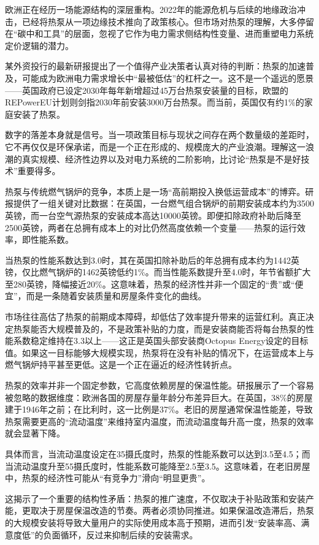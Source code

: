 \documentclass[11pt]{ctexart}
\begin{document}
欧洲正在经历一场能源结构的深层重构。2022年的能源危机与后续的地缘政治冲击，已经将热泵从一项边缘技术推向了政策核心。但市场对热泵的理解，大多停留在“碳中和工具”的层面，忽视了它作为电力需求侧结构性变量、进而重塑电力系统定价逻辑的潜力。

某外资投行的最新研报提出了一个值得产业决策者认真对待的判断：热泵的加速普及，可能成为欧洲电力需求增长中“最被低估”的杠杆之一。这不是一个遥远的愿景——英国政府已设定2030年每年新增超过45万台热泵安装量的目标，欧盟的REPowerEU计划则剑指2030年前安装3000万台热泵。而当前，英国仅有约1\%的家庭安装了热泵。

数字的落差本身就是信号。当一项政策目标与现状之间存在两个数量级的差距时，它不再仅仅是环保承诺，而是一个正在形成的、规模庞大的产业浪潮。理解这一浪潮的真实规模、经济性边界以及对电力系统的二阶影响，比讨论“热泵是不是好技术”重要得多。

热泵与传统燃气锅炉的竞争，本质上是一场“高前期投入换低运营成本”的博弈。研报提供了一组关键对比数据：在英国，一台燃气组合锅炉的前期安装成本约为3500英镑，而一台空气源热泵的安装成本高达10000英镑。即便扣除政府补助后降至2500英镑，两者在总拥有成本上的对比仍然高度依赖一个变量——热泵的运行效率，即性能系数。

当热泵的性能系数达到3.0时，其在英国扣除补助后的年总拥有成本约为1442英镑，仅比燃气锅炉的1462英镑低约1\%。而当性能系数提升至4.0时，年节省额扩大至280英镑，降幅接近20\%。这意味着，热泵的经济性并非一个固定的“贵”或“便宜”，而是一条随着安装质量和房屋条件变化的曲线。

市场往往高估了热泵的前期成本障碍，却低估了效率提升带来的运营红利。真正决定热泵能否大规模普及的，不是政策补贴的力度，而是安装商能否将每台热泵的性能系数稳定维持在3.3以上——这正是英国头部安装商Octopus Energy设定的目标值。如果这一目标能够大规模实现，热泵将在没有补贴的情况下，在运营成本上与燃气锅炉持平甚至更低。这是一个正在逼近的经济性转折点。

热泵的效率并非一个固定参数，它高度依赖房屋的保温性能。研报展示了一个容易被忽略的数据维度：欧洲各国的房屋存量年龄分布差异巨大。在英国，38\%的房屋建于1946年之前；在比利时，这一比例是37\%。老旧的房屋通常保温性能差，导致热泵需要更高的“流动温度”来维持室内温度，而流动温度每升高一度，热泵的效率就会显著下降。

具体而言，当流动温度设定在35摄氏度时，热泵的性能系数可以达到3.5至4.5；而当流动温度升至55摄氏度时，性能系数可能降至2.5至3.5。这意味着，在老旧房屋中，热泵的经济性可能从“有竞争力”滑向“明显更贵”。

这揭示了一个重要的结构性矛盾：热泵的推广速度，不仅取决于补贴政策和安装产能，更取决于房屋保温改造的节奏。两者必须协同推进。如果保温改造滞后，热泵的大规模安装将导致大量用户的实际使用成本高于预期，进而引发“安装率高、满意度低”的负面循环，反过来抑制后续的安装需求。
\end{document}
